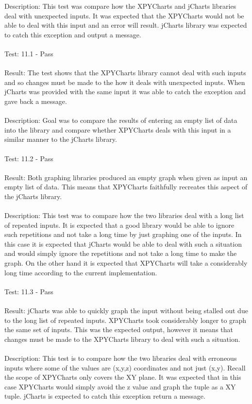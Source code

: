 \documentclass[12pt, titlepage]{article}
\begin{document}
Description: This test was compare how the XPYCharts and jCharts libraries deal with unexpected inputs. It was expected that the XPYCharts would not be able to deal with this input and an error will result. jCharts library was expected to catch this exception and output a message.\\\\
Test: 11.1 - Pass\\\\
Result: The test shows that the XPYCharts library cannot deal with such inputs and so changes must be made to the how it deals with unexpected inputs. When jCharts was provided with the same input it was able to catch the exception and gave back a message.\\\\
Description:  Goal was to compare the results of entering an empty list of data into the library and compare whether XPYCharts deals with this input in a similar manner to the jCharts library.\\\\
Test: 11.2 - Pass\\\\
Result: Both graphing libraries produced an empty graph when given as input an empty list of data. This means that XPYCharts faithfully recreates this aspect of the jCharts library.\\\\
Description: This test was to compare how the two libraries deal with a long list of repeated inputs. It is expected that a good library would be able to ignore such repetitions and not take a long time by just graphing one of the inputs. In this case it is expected that jCharts would be able to deal with such a situation and would simply ignore the repetitions and not take a long time to make the graph. On the other hand it is expected that XPYCharts will take a considerably long time according to the current implementation. \\\\
Test: 11.3 - Pass\\\\
Result: jCharts was able to quickly graph the input without being stalled out due to the long list of repeated inputs. XPYCharts took considerably longer to graph the same set of inputs. This was the expected output, however it means that changes must be made to the XPYCharts library to deal with such a situation.\\\\
Description: This test is to compare how the two libraries deal with erroneous inputs where some of the values are (x,y,z) coordinates and not just (x,y). Recall the scope of XPYCharts only covers the XY plane. It was expected that in this case XPYCharts would simply avoid the z value and graph the tuple as a XY tuple. jCharts is expected to catch this exception return a message.\\\\
\end{document}
